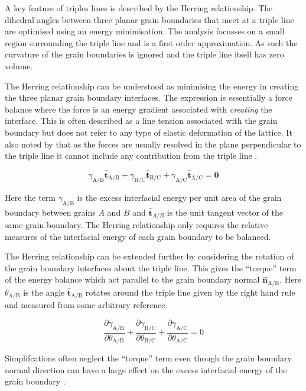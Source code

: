 \documentclass[12pt,a4paper,openany]{report}
\newcommand{\ts}[1]{\textrm{#1}}
\begin{document}
A key feature of triples lines is described by the Herring relationship. The dihedral angles between three planar grain boundaries that meet at a triple line are optimised using an energy minimisation. The analysis focusses on a small region surrounding the triple line and is a first order approximation. As such the curvature of the grain boundaries is ignored and the triple line itself has zero volume. 

The Herring relationship can be understood as minimising the energy in creating the three planar grain boundary interfaces. The expression is essentially a force balance where the force is an energy gradient associated with \emph{creating} the interface. This is often described as a line tension associated with the grain boundary but does not refer to any type of elastic deformation of the lattice. It also noted by \citeauthor{CRAIGCARTER} that as the forces are usually resolved in the plane perpendicular to the triple line it cannot include any contribution from the triple line \cite{CRAIGCARTER}. 
     
\[\gamma_{\ts{A/B}}\mathbf{\hat{t}}_{\ts{A/B}} + \gamma_{\ts{B/C}}\mathbf{\hat{t}}_{\ts{B/C}} + \gamma_{\ts{A/C}}\mathbf{\hat{t}}_{\ts{A/C}} =\mathbf{0} \]

Here the term $\gamma_{\ts{A/B}}$ is the excess interfacial energy per unit area of the grain boundary between grains $A$ and $B$ and $\mathbf{\hat{t}}_{A/B}$ is the unit tangent vector of the same grain boundary. The Herring relationship only requires the relative measures of the interfacial energy of each grain boundary to be balanced.

The Herring relationship can be extended further by considering the rotation of the grain boundary interfaces about the triple line. This gives the ``torque'' term of the energy balance which act parallel to the grain boundary normal $\mathbf{\hat{n}}_{\ts{A/B}}$. Here $\theta_{\ts{A/B}}$ is the angle $\mathbf{\hat{t}}_{\ts{A/B}}$ rotates around the triple line given by the right hand rule and measured from some arbitrary reference. 

\[\frac{\partial \gamma_{\ts{A/B}}}{\partial \theta_{\ts{A/B}}} +\frac{\partial \gamma_{\ts{B/C}}}{\partial \theta_{\ts{B/C}}}+\frac{\partial \gamma_{\ts{A/C}}}{\partial \theta_{\ts{A/C}}} =0\]


Simplifcations often neglect the ``torque''  term even though the grain boundary normal direction can have a large effect on the excess interfacial energy of the grain boundary \cite{Rowenhurst}.
\end{document}
